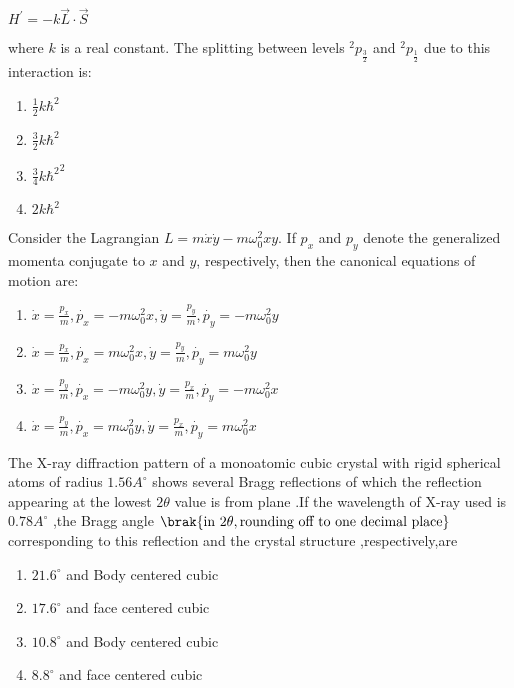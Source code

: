 \begin{center}
 $H^{\prime} = -k\overrightarrow{L}\cdot\overrightarrow{S} $  
\end{center}
where $k$  is a real constant. The splitting between levels $^2p_{\frac{3}{2}}$ and $^2p_{\frac{1}{2}}$ due to this interaction is:
\begin{enumerate}
	\item $\frac{1}{2}k{\hbar}^2$ 
	\item $\frac{3}{2}k{\hbar}^2$ 
	\item $\frac{3}{4}k{\hbar^2}^2$ 
	\item $2k{\hbar}^2$
\end{enumerate}
\item Consider the Lagrangian $L=m\dot{x}\dot{y}-m\omega_0^2xy$. If $p_x$ and $p_y$ denote the generalized momenta conjugate to $x$ and $y$, respectively, then the canonical equations of motion are:
\begin{enumerate}
\item $\dot{x}=\frac{p_x}{m},\dot{p_x}=-m\omega_0^2x,\dot{y}=\frac{p_y}{m},\dot{p_y}=-m\omega_0^2y$
\item $\dot{x} = \frac{p_x}{m},\dot{p_x}=m\omega_0^2x,\dot{y}=\frac{p_y}{m},\dot{p_y}=m\omega_0^2y$
\item $\dot{x}=\frac{p_y}{m},\dot{p_x}=-m\omega_0^2 y,\dot{y}=\frac{p_x}{m},\dot{p_y}=-m\omega_0^2x$
\item $\dot{x}=\frac{p_y}{m},\dot{p_x}=m\omega_0^2y,\dot{y}=\frac{p_x}{m},\dot{p_y}=m\omega_0^2 x$
\end{enumerate}
\item The X-ray diffraction pattern of a monoatomic cubic crystal with rigid spherical atoms of radius $1.56A^{\circ}$ shows several Bragg reflections of which the reflection appearing at the lowest $2\theta$ value is from  plane .If the wavelength of X-ray used is $0.78A^{\circ}$ ,the Bragg angle $\brak{\text{in} \, \, 2\theta , \text{rounding off to one decimal place}}$ corresponding to this reflection and the crystal structure ,respectively,are
\begin{enumerate}
\item $21.6^{\circ}$ and Body centered cubic
\item $17.6^{\circ}$ and face centered cubic
\item $10.8^{\circ}$ and Body centered cubic
\item $8.8^{\circ}$ and face centered cubic
\end{enumerate}
     
